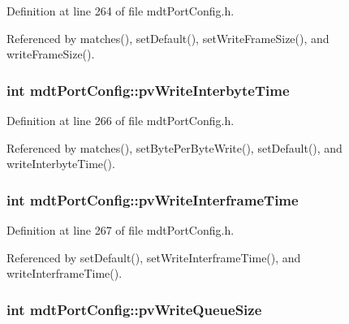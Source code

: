 Definition at line 264 of file mdt\-Port\-Config.\-h.



Referenced by matches(), set\-Default(), set\-Write\-Frame\-Size(), and write\-Frame\-Size().

\hypertarget{classmdt_port_config_af983cf9d9f9e2f124d6dcc83cdca5a3e}{
\subsubsection[{pv\-Write\-Interbyte\-Time}]{\setlength{\rightskip}{0pt plus 5cm}int mdt\-Port\-Config\-::pv\-Write\-Interbyte\-Time\hspace{0.3cm}{\ttfamily [protected]}}}\label{classmdt_port_config_af983cf9d9f9e2f124d6dcc83cdca5a3e}


Definition at line 266 of file mdt\-Port\-Config.\-h.



Referenced by matches(), set\-Byte\-Per\-Byte\-Write(), set\-Default(), and write\-Interbyte\-Time().

\hypertarget{classmdt_port_config_ace2001b084ab2611c2de56c951974457}{
\subsubsection[{pv\-Write\-Interframe\-Time}]{\setlength{\rightskip}{0pt plus 5cm}int mdt\-Port\-Config\-::pv\-Write\-Interframe\-Time\hspace{0.3cm}{\ttfamily [protected]}}}\label{classmdt_port_config_ace2001b084ab2611c2de56c951974457}


Definition at line 267 of file mdt\-Port\-Config.\-h.



Referenced by set\-Default(), set\-Write\-Interframe\-Time(), and write\-Interframe\-Time().

\hypertarget{classmdt_port_config_a547f27521b405528f86259fa9aaa37c5}{
\subsubsection[{pv\-Write\-Queue\-Size}]{\setlength{\rightskip}{0pt plus 5cm}int mdt\-Port\-Config\-::pv\-Write\-Queue\-Size\hspace{0.3cm}{\ttfamily [protected]}}}\label{classmdt_port_config_a547f27521b405528f86259fa9aaa37c5}


